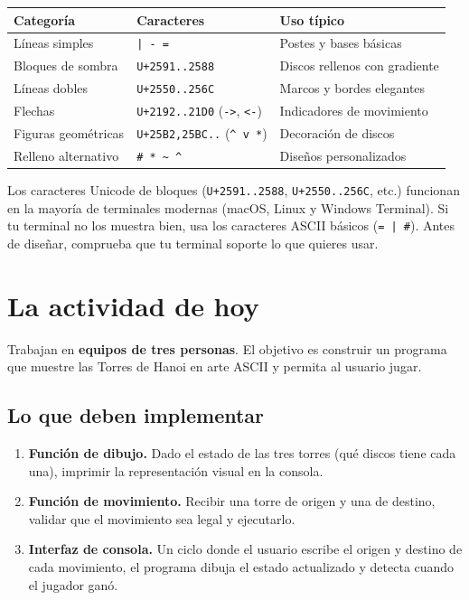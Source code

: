 \documentclass[12pt, oneside]{article}
\begin{document}
\begin{center}
\begin{tabular}{llp{6cm}}
  \toprule
  \textbf{Categoría} & \textbf{Caracteres} & \textbf{Uso típico} \\
  \midrule
  Líneas simples    & \texttt{| - =}              & Postes y bases básicas \\
  Bloques de sombra & \texttt{U+2591..2588} & Discos rellenos con gradiente \\
  Líneas dobles     & \texttt{U+2550..256C} & Marcos y bordes elegantes \\
  Flechas           & \texttt{U+2192..21D0} (\texttt{->}, \texttt{<-}) & Indicadores de movimiento \\
  Figuras geométricas & \texttt{U+25B2,25BC..} (\texttt{\^{} v *}) & Decoración de discos \\
  Relleno alternativo & \texttt{\# * \textasciitilde{} \^{}}    & Diseños personalizados \\
  \bottomrule
\end{tabular}
\end{center}

\begin{consejo}
  Los caracteres Unicode de bloques (\texttt{U+2591..2588},
  \texttt{U+2550..256C}, etc.) funcionan en la mayoría de terminales
  modernas (macOS, Linux y Windows Terminal).
  Si tu terminal no los muestra bien, usa los caracteres ASCII básicos
  (\texttt{= | \#}).
  Antes de diseñar, comprueba que tu terminal soporte lo que quieres usar.
\end{consejo}

\section{La actividad de hoy}

Trabajan en \textbf{equipos de tres personas}.
El objetivo es construir un programa que muestre las Torres de Hanoi
en arte ASCII y permita al usuario jugar.

\subsection{Lo que deben implementar}

\begin{enumerate}
  \item \textbf{Función de dibujo.}
        Dado el estado de las tres torres (qué discos tiene cada una),
        imprimir la representación visual en la consola.

  \item \textbf{Función de movimiento.}
        Recibir una torre de origen y una de destino, validar que el
        movimiento sea legal y ejecutarlo.

  \item \textbf{Interfaz de consola.}
        Un ciclo donde el usuario escribe el origen y destino de cada
        movimiento, el programa dibuja el estado actualizado y detecta
        cuando el jugador ganó.
\end{enumerate}
\end{document}
